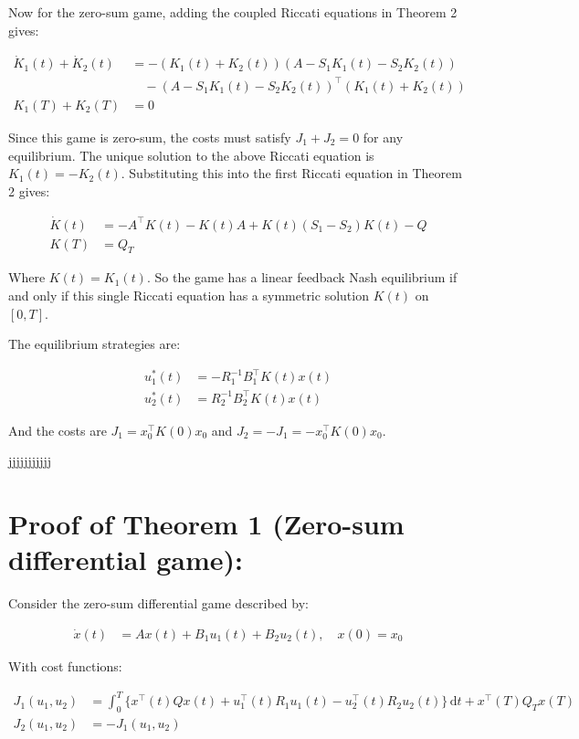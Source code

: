 \documentclass[3p]{elsarticle}
\begin{document}
Now for the zero-sum game, adding the coupled Riccati equations in Theorem 2 gives:

\begin{align*}
\dot{K}_1(t) + \dot{K}_2(t) &= -(K_1(t) + K_2(t))(A - S_1K_1(t) - S_2K_2(t)) \\  
&\quad - (A - S_1K_1(t) - S_2K_2(t))^\top(K_1(t) + K_2(t)) \\
K_1(T) + K_2(T) &= 0
\end{align*}

Since this game is zero-sum, the costs must satisfy $J_1 + J_2 = 0$ for any equilibrium. The unique solution to the above Riccati equation is $K_1(t) = -K_2(t)$. Substituting this into the first Riccati equation in Theorem 2 gives:

\begin{align*} 
\dot{K}(t) &= -A^\top K(t) - K(t)A + K(t)(S_1-S_2)K(t) - Q \\
K(T) &= Q_T
\end{align*}

Where $K(t) = K_1(t)$. So the game has a linear feedback Nash equilibrium if and only if this single Riccati equation has a symmetric solution $K(t)$ on $[0,T]$. 

The equilibrium strategies are:

\begin{align*}
u_1^*(t) &= -R_1^{-1}B_1^\top K(t) x(t) \\ 
u_2^*(t) &= R_2^{-1}B_2^\top K(t) x(t)
\end{align*}

And the costs are $J_1 = x_0^\top K(0) x_0$ and $J_2 = -J_1 = -x_0^\top K(0) x_0$.

jjjjjjjjjjj
\section*{Proof of Theorem 1 (Zero-sum differential game):}

Consider the zero-sum differential game described by:

\begin{align*}
\dot{x}(t) &= Ax(t) + B_1u_1(t) + B_2u_2(t), \quad x(0)=x_0
\end{align*}

With cost functions:

\begin{align*}
J_1(u_1,u_2) &= \int_0^T \{x^\top (t)Qx(t) + u_1^\top(t) R_1u_1(t) - u_2^\top(t)R_2u_2(t)\}\,\mathrm{d}t + x^\top(T)Q_Tx(T) \\
J_2(u_1,u_2) &= -J_1(u_1,u_2)
\end{align*}
\end{document}
